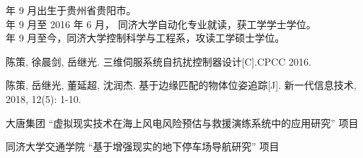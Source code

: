  年 9 月出生于贵州省贵阳市。\\
 年 9 月至 2016 年 6 月， 同济大学自动化专业就读，获工学学士学位。\\
 年 9 月至今，同济大学控制科学与工程系，攻读工学硕士学位。

\begin{enumerate}[{[}1{]}]
\item 陈策, 徐晨剑, 岳继光. 三维伺服系统自抗扰控制器设计[C].CPCC 2016.
\item 陈策, 岳继光, 董延超, 沈润杰. 基于边缘匹配的物体位姿追踪[J]. 新一代信息技术, 2018, 12(5): 1-10.
\end{enumerate}

\begin{enumerate}[{[}1{]}]
\item 大唐集团 “虚拟现实技术在海上风电风险预估与救援演练系统中的应用研究” 项目
\item 同济大学交通学院 “基于增强现实的地下停车场导航研究” 项目
\end{enumerate}
